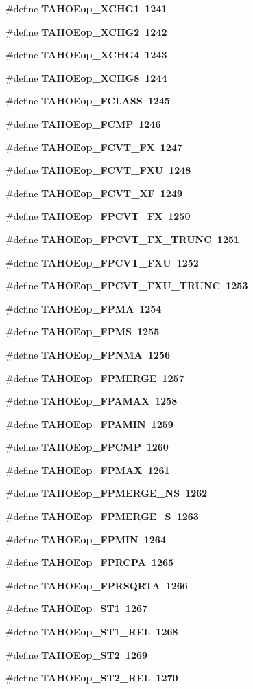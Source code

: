 \begin{CompactItemize}
\item 
\#define \bf{TAHOEop\_\-XCHG1}~1241
\item 
\#define \bf{TAHOEop\_\-XCHG2}~1242
\item 
\#define \bf{TAHOEop\_\-XCHG4}~1243
\item 
\#define \bf{TAHOEop\_\-XCHG8}~1244
\item 
\#define \bf{TAHOEop\_\-FCLASS}~1245
\item 
\#define \bf{TAHOEop\_\-FCMP}~1246
\item 
\#define \bf{TAHOEop\_\-FCVT\_\-FX}~1247
\item 
\#define \bf{TAHOEop\_\-FCVT\_\-FXU}~1248
\item 
\#define \bf{TAHOEop\_\-FCVT\_\-XF}~1249
\item 
\#define \bf{TAHOEop\_\-FPCVT\_\-FX}~1250
\item 
\#define \bf{TAHOEop\_\-FPCVT\_\-FX\_\-TRUNC}~1251
\item 
\#define \bf{TAHOEop\_\-FPCVT\_\-FXU}~1252
\item 
\#define \bf{TAHOEop\_\-FPCVT\_\-FXU\_\-TRUNC}~1253
\item 
\#define \bf{TAHOEop\_\-FPMA}~1254
\item 
\#define \bf{TAHOEop\_\-FPMS}~1255
\item 
\#define \bf{TAHOEop\_\-FPNMA}~1256
\item 
\#define \bf{TAHOEop\_\-FPMERGE}~1257
\item 
\#define \bf{TAHOEop\_\-FPAMAX}~1258
\item 
\#define \bf{TAHOEop\_\-FPAMIN}~1259
\item 
\#define \bf{TAHOEop\_\-FPCMP}~1260
\item 
\#define \bf{TAHOEop\_\-FPMAX}~1261
\item 
\#define \bf{TAHOEop\_\-FPMERGE\_\-NS}~1262
\item 
\#define \bf{TAHOEop\_\-FPMERGE\_\-S}~1263
\item 
\#define \bf{TAHOEop\_\-FPMIN}~1264
\item 
\#define \bf{TAHOEop\_\-FPRCPA}~1265
\item 
\#define \bf{TAHOEop\_\-FPRSQRTA}~1266
\item 
\#define \bf{TAHOEop\_\-ST1}~1267
\item 
\#define \bf{TAHOEop\_\-ST1\_\-REL}~1268
\item 
\#define \bf{TAHOEop\_\-ST2}~1269
\item 
\#define \bf{TAHOEop\_\-ST2\_\-REL}~1270
\item 

\end{CompactItemize}
